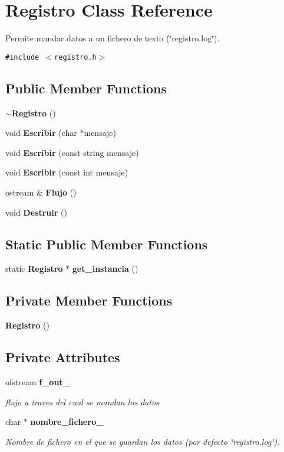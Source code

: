 \section{Registro Class Reference}
\label{classRegistro}
Permite mandar datos a un fichero de texto (\char`\"{}registro.log\char`\"{}).  


{\tt \#include $<$registro.h$>$}

\subsection*{Public Member Functions}
\begin{CompactItemize}
\item 
{\bf $\sim$Registro} ()
\item 
void {\bf Escribir} (char $\ast$mensaje)
\item 
void {\bf Escribir} (const string mensaje)
\item 
void {\bf Escribir} (const int mensaje)
\item 
ostream \& {\bf Flujo} ()
\item 
void {\bf Destruir} ()
\end{CompactItemize}
\subsection*{Static Public Member Functions}
\begin{CompactItemize}
\item 
static {\bf Registro} $\ast$ {\bf get\_\-instancia} ()
\end{CompactItemize}
\subsection*{Private Member Functions}
\begin{CompactItemize}
\item 
{\bf Registro} ()
\end{CompactItemize}
\subsection*{Private Attributes}
\begin{CompactItemize}
\item 
ofstream {\bf f\_\-out\_\-}
\begin{CompactList}\small\item\em flujo a traves del cual se mandan los datos \item\end{CompactList}\item 
char $\ast$ {\bf nombre\_\-fichero\_\-}
\begin{CompactList}\small\item\em Nombre de fichero en el que se guardan los datos (por defecto \char`\"{}registro.log\char`\"{}). \item\end{CompactList}\end{CompactItemize}
